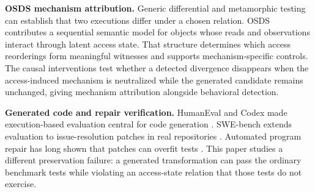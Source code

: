 \textbf{OSDS mechanism attribution.} Generic differential and metamorphic testing can establish that two executions differ under a chosen relation. OSDS contributes a sequential semantic model for objects whose reads and observations interact through latent access state. That structure determines which access reorderings form meaningful witnesses and supports mechanism-specific controls. The causal interventions test whether a detected divergence disappears when the access-induced mechanism is neutralized while the generated candidate remains unchanged, giving mechanism attribution alongside behavioral detection.

\textbf{Generated code and repair verification.} HumanEval and Codex made execution-based evaluation central for code generation \citep{chen2021codex}. SWE-bench extends evaluation to issue-resolution patches in real repositories \citep{jimenez2024swebench}. Automated program repair has long shown that patches can overfit tests \citep{legoues2012genprog,smith2015overfitting}. This paper studies a different preservation failure: a generated transformation can pass the ordinary benchmark tests while violating an access-state relation that those tests do not exercise.
